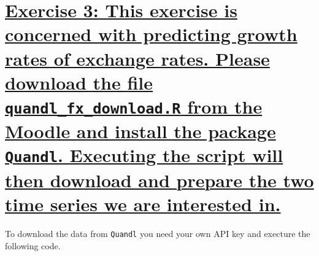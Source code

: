 \documentclass[12pt,a4paper]{article}
\newcommand{\tmpsection}[1]{}
\let\tmpsection=\section
\renewcommand{\section}[1]{\tmpsection{\underline{#1}} }
\begin{document}
\hypertarget{exercise-3-this-exercise-is-concerned-with-predicting-growth-rates-of-exchange-rates.-please-download-the-file-quandl_fx_download.r-from-the-moodle-and-install-the-package-quandl.-executing-the-script-will-then-download-and-prepare-the-two-time-series-we-are-interested-in.}{%
\section{\texorpdfstring{Exercise 3: This exercise is concerned with
predicting growth rates of exchange rates. Please download the file
\texttt{quandl\_fx\_download.R} from the Moodle and install the package
\texttt{Quandl}. Executing the script will then download and prepare the
two time series we are interested
in.}{Exercise 3: This exercise is concerned with predicting growth rates of exchange rates. Please download the file quandl\_fx\_download.R from the Moodle and install the package Quandl. Executing the script will then download and prepare the two time series we are interested in.}}\label{exercise-3-this-exercise-is-concerned-with-predicting-growth-rates-of-exchange-rates.-please-download-the-file-quandl_fx_download.r-from-the-moodle-and-install-the-package-quandl.-executing-the-script-will-then-download-and-prepare-the-two-time-series-we-are-interested-in.}}

To download the data from \texttt{Quandl} you need your own API key and
execture the following code.
\end{document}
